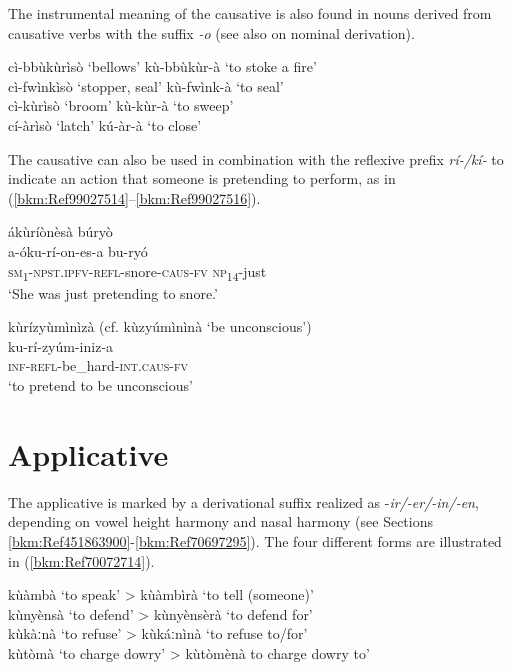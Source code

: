 The instrumental meaning of the causative is also found in nouns derived from causative verbs with the suffix \textit{-o} (see also  on nominal derivation).

\ea
cì-bbùkùrìsò \tab ‘bellows’ \tab kù-bbùkùr-à \tab ‘to stoke a fire’\\
cì-fwìnkìsò \tab ‘stopper, seal’ \tab kù-fwìnk-à \tab ‘to seal’\\
cì-kùrìsò \tab ‘broom’ \tab kù-kùr-à \tab ‘to sweep’\\
cí-àrìsò \tab ‘latch’ \tab kú-àr-à \tab ‘to close’\\
\z

The causative can also be used in combination with the reflexive prefix \textit{rí-/kí-} to indicate an action that someone is pretending to perform, as in (\ref{bkm:Ref99027514}--\ref{bkm:Ref99027516}).

\ea
\label{bkm:Ref99027514}
ákùríònèsà búryò \\
\gll a-óku-rí-on-es-a        bu-ryó\\
\textsc{sm}\textsubscript{1}-\textsc{npst}.\textsc{ipfv}-\textsc{refl}-snore-\textsc{caus}-\textsc{fv}   \textsc{np}\textsubscript{14}-just\\
\glt ‘She was just pretending to snore.’
\z

\ea
\label{bkm:Ref99027516}
kùrízyùmìnìzà (cf. kùzyúmìnìnà ‘be unconscious’)\\
ku-rí-zyúm-iniz-a\\
\textsc{inf}-\textsc{refl}-be\_hard-\textsc{int}.\textsc{caus}-\textsc{fv}\\
\glt ‘to pretend to be unconscious’
\z
\section{Applicative}
\label{bkm:Ref451514914}\hypertarget{Toc75352660}{}
The applicative is marked by a derivational suffix realized as \nobreakdash-\textit{ir/\nobreakdash-er/\nobreakdash-in/-en}, depending on vowel height harmony and nasal harmony (see Sections \ref{bkm:Ref451863900}-\ref{bkm:Ref70697295}). The four different forms are illustrated in (\ref{bkm:Ref70072714}).

\ea
\label{bkm:Ref70072714}
kùàmbà  ‘to speak’ \tab    >  kùàmbìrà ‘to tell (someone)’\\
kùnyènsà ‘to defend’ \tab   > kùnyènsèrà ‘to defend for’\\
kùkàːnà ‘to refuse’  \tab   > kùkáːnìnà ‘to refuse to/for’\\
kùtòmà ‘to charge dowry’ \tab  > kùtòmènà to charge dowry to’
\z


